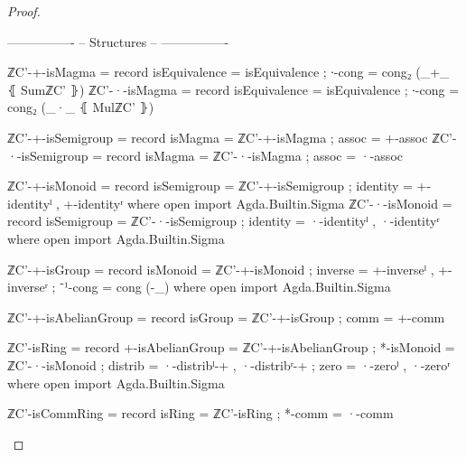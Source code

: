 \documentclass[a4paper]{report}
\theoremstyle{definition}
\begin{document}
\begin{proof}
\begin{code}
  ----------------
  -- Structures --
  ----------------

  ℤC'-+-isMagma = record
    { isEquivalence = isEquivalence
    ; ∙-cong        =  cong₂ (_+_ ⦃ SumℤC' ⦄)
    }
  ℤC'-·-isMagma = record
    { isEquivalence = isEquivalence
    ; ∙-cong        =  cong₂ (_·_ ⦃ MulℤC' ⦄)
    }

  ℤC'-+-isSemigroup = record
    { isMagma = ℤC'-+-isMagma
    ; assoc   = +-assoc
    }
  ℤC'-·-isSemigroup = record
    { isMagma = ℤC'-·-isMagma
    ; assoc   = ·-assoc
    }

  ℤC'-+-isMonoid = record
    { isSemigroup = ℤC'-+-isSemigroup
    ; identity    = +-identityˡ , +-identityʳ
    }
    where open import Agda.Builtin.Sigma
  ℤC'-·-isMonoid = record
    { isSemigroup = ℤC'-·-isSemigroup
    ; identity    = ·-identityˡ , ·-identityʳ
    }
    where open import Agda.Builtin.Sigma

  ℤC'-+-isGroup = record
    { isMonoid = ℤC'-+-isMonoid
    ; inverse  = +-inverseˡ , +-inverseʳ
    ; ⁻¹-cong  = cong (-_)
    }
    where open import Agda.Builtin.Sigma

  ℤC'-+-isAbelianGroup = record
    { isGroup = ℤC'-+-isGroup
    ; comm    = +-comm
    }

  ℤC'-isRing = record
    { +-isAbelianGroup = ℤC'-+-isAbelianGroup
    ; *-isMonoid       = ℤC'-·-isMonoid
    ; distrib          = ·-distribˡ-+ , ·-distribʳ-+
    ; zero             = ·-zeroˡ , ·-zeroʳ
    }
    where open import Agda.Builtin.Sigma

  ℤC'-isCommRing = record
    { isRing = ℤC'-isRing
    ; *-comm = ·-comm
    }

  \end{code}
\end{proof}
\end{document}
